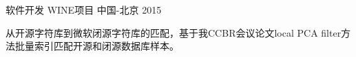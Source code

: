 \begin{cventries}

\cventry
{软件开发} %
{WINE项目} %
{中国-北京} %
{2015} %
{ %
\begin{cvitems}
\item {从开源字符库到微软闭源字符库的匹配，基于我CCBR会议论文local PCA filter方法批量索引匹配开源和闭源数据库样本。}
\end{cvitems}
}


\end{cventries}
